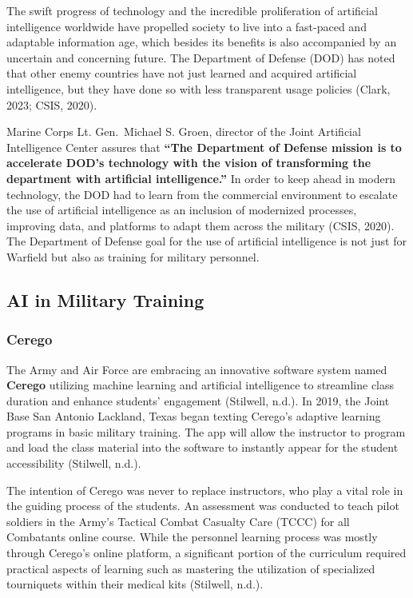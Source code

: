 \documentclass[
]{article}
\begin{document}
The swift progress of technology and the incredible proliferation of artificial intelligence worldwide have propelled society to live into a fast-paced and adaptable information age, which besides its benefits is also accompanied by an uncertain and concerning future. The Department of Defense (DOD) has noted that other enemy countries have not just learned and acquired artificial intelligence, but they have done so with less transparent usage policies (Clark, 2023; CSIS, 2020).

Marine Corps Lt. Gen.~Michael S. Groen, director of the Joint Artificial Intelligence Center assures that \textbf{``The Department of Defense mission is to accelerate DOD's technology with the vision of transforming the department with artificial intelligence.''} In order to keep ahead in modern technology, the DOD had to learn from the commercial environment to escalate the use of artificial intelligence as an inclusion of modernized processes, improving data, and platforms to adapt them across the military (CSIS, 2020). The Department of Defense goal for the use of artificial intelligence is not just for Warfield but also as training for military personnel.

\hypertarget{ai-in-military-training}{%
\subsection{AI in Military Training}\label{ai-in-military-training}}

\hypertarget{cerego}{%
\subsubsection{Cerego}\label{cerego}}

The Army and Air Force are embracing an innovative software system named \textbf{Cerego} utilizing machine learning and artificial intelligence to streamline class duration and enhance students' engagement (Stilwell, n.d.). In 2019, the Joint Base San Antonio Lackland, Texas began texting Cerego's adaptive learning programs in basic military training. The app will allow the instructor to program and load the class material into the software to instantly appear for the student accessibility (Stilwell, n.d.).

The intention of Cerego was never to replace instructors, who play a vital role in the guiding process of the students. An assessment was conducted to teach pilot soldiers in the Army's Tactical Combat Casualty Care (TCCC) for all Combatants online course. While the personnel learning process was mostly through Cerego's online platform, a significant portion of the curriculum required practical aspects of learning such as mastering the utilization of specialized tourniquets within their medical kits (Stilwell, n.d.).
\end{document}
